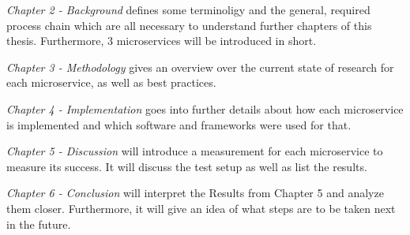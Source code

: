 \emph{Chapter 2 - Background} defines some terminoligy and the general, required process chain which are all necessary to understand further chapters of this thesis. Furthermore, 3 microservices will be introduced in short.

\emph{Chapter 3 - Methodology} gives an overview over the current state of research for each microservice, as well as best practices. 

\emph{Chapter 4 - Implementation} goes into further details about how each microservice is implemented and which software and frameworks were used for that.

\emph{Chapter 5 - Discussion} will introduce a measurement for each microservice to measure its success. It will discuss the test setup as well as list the results.

\emph{Chapter 6 - Conclusion} will interpret the Results from Chapter 5 and analyze them closer. Furthermore, it will give an idea of what steps are to be taken next in the future.